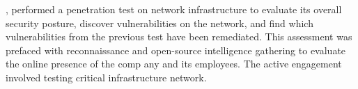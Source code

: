 \timeRange, \team performed a penetration test on \clientP network infrastructure to evaluate its overall security posture, discover vulnerabilities on the network, and find which vulnerabilities from the previous test have been remediated. This assessment was prefaced with reconnaissance and open-source intelligence gathering to evaluate the online presence of the comp any and its employees. The active engagement involved testing \clientP critical infrastructure network.
